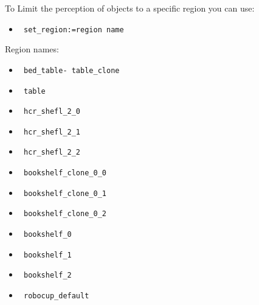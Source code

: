 \documentclass[main.tex]{subfiles}
\begin{document}
To Limit the perception of objects to a specific region you can use:
\begin{itemize}
\item \begin{verbatim} set_region:=region name \end{verbatim} 
\end{itemize}
Region names:
\begin{itemize}
\item \begin{verbatim} bed_table- table_clone \end{verbatim} 
\item \begin{verbatim} table \end{verbatim} 
\item \begin{verbatim} hcr_shefl_2_0 \end{verbatim} 
\item \begin{verbatim} hcr_shefl_2_1 \end{verbatim}
\item \begin{verbatim} hcr_shefl_2_2 \end{verbatim}
\item \begin{verbatim} bookshelf_clone_0_0 \end{verbatim} 
\item \begin{verbatim} bookshelf_clone_0_1 \end{verbatim} 
\item \begin{verbatim} bookshelf_clone_0_2 \end{verbatim} 
\item \begin{verbatim} bookshelf_0 \end{verbatim} 
\item \begin{verbatim} bookshelf_1 \end{verbatim} 
\item \begin{verbatim} bookshelf_2 \end{verbatim} 
\item \begin{verbatim} robocup_default \end{verbatim} 
\end{itemize}
\end{document}
